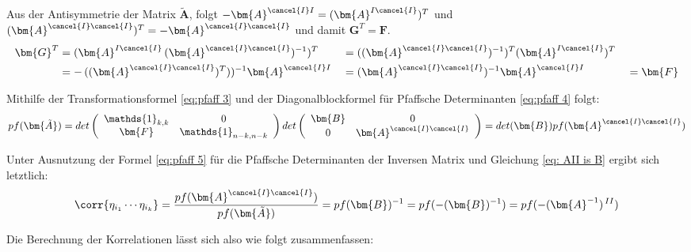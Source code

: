 \noindent Aus der Antisymmetrie der Matrix $\bm{\tilde{A}}$, folgt $ - \bm{A}^{\cancel{I} I} = (\bm{A}^{I\cancel{I}})^T
$ und $ (\bm{A}^{\cancel{I} \cancel{I}})^T = - \bm{A}^{\cancel{I} \cancel{I}}$ und damit $\bm{G}^T = \bm{F}$.
\begin{alignat}{3}
    \bm{G}^T 
    &= (\bm{A}^{I \cancel{I} }\, (\bm{A}^{\cancel{I} \cancel{I}})^{-1})^T 
    &&=((\bm{A}^{\cancel{I} \cancel{I}})^{-1})^T (\bm{A}^{I \cancel{I} })^T &&\nonumber \\
    &= -\,((\bm{A}^{\cancel{I} \cancel{I}})^T))^{-1}\bm{A}^{\cancel{I}I  } 
    &&= (\bm{A}^{\cancel{I} \cancel{I}})^{-1}\bm{A}^{\cancel{I}I  }
    &&= \bm{F} \nonumber
\end{alignat}

\noindent Mithilfe der Transformationsformel \eqref{eq:pfaff 3} und der Diagonalblockformel für Pfaffsche Determinanten \eqref{eq:pfaff 4} folgt:
\begin{equation}
pf(\bm{\tilde{A}}) = det
    \left(\begin{array}{cc} 
        \mathds{1}_{k,k}      &  0 \\
        \bm{F} &  \mathds{1}_{n-k, n-k}
    \end{array}\right)
    det
    \left(\begin{array}{cc} 
        \bm{B}     &  0 \\
        0 &  \bm{A}^{\cancel{I} \cancel{I}}
    \end{array}\right)
    =
    det(\bm{B}) pf( \bm{A}^{\cancel{I} \cancel{I}}) \nonumber
\end{equation}

\noindent Unter Ausnutzung der Formel \eqref{eq:pfaff 5} für die Pfaffsche Determinanten der Inversen Matrix und Gleichung \eqref{eq: AII is B} ergibt sich letztlich:
\begin{equation}
    \corr{\eta_{i_1} \cdots \eta_{i_k}}  = \frac{pf(\bm{A}^{\cancel{I} \cancel{I}}) }{pf(\bm{\tilde{A}})} = pf(\bm{B})^{-1} = pf(-(\bm{B})^{-1}) = pf(-(\bm{A}^{-1})^{\,II}) \nonumber
\end{equation}

\noindent Die Berechnung der Korrelationen lässt sich also wie folgt zusammenfassen:

